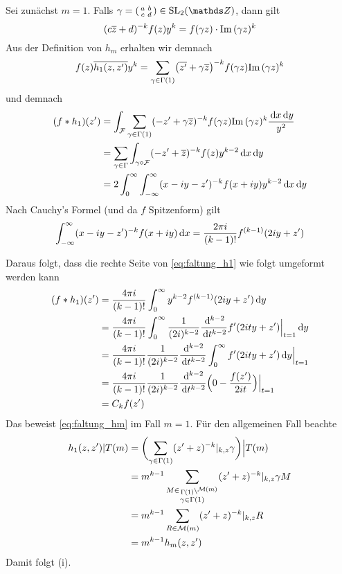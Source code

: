 \begin{bewe}
	Sei zunächst $m=1$.
	Falls $\gamma = \abcd \in \SL_2(\ZZ)$, dann gilt
	\[
	(c\overline{z} + d)^{-k} f(z) y^k = f(\gamma z) \cdot \mathrm{Im}\, (\gamma z)^k
	\]
	Aus der Definition von $h_m$ erhalten wir demnach
	\[
	f(z)\overline{h_1(z, z')} y^k
	= \sum_{\gamma \in \Gamma(1)} \bigl(\overline{z'} + \gamma \overline{z}\bigr)^{-k} f(\gamma z) \mathrm{Im}\,(\gamma z)^k
	\]
	und demnach
	\begin{equation}\label{eq:faltung_h1}%
	\begin{split}
	(f * h_1)(z') &= \int_\F \sum_{\gamma \in \Gamma(1)} (-z' + \gamma \conj z)^{-k} f(\gamma z) \Im(\gamma z)^k \frac{\opd x \opd y}{y^2} \\
	&= \sum_{\gamma \in \Gamma} \int_{\gamma \circ \F} (-z' + \conj z)^{-k} f(z) y^{k-2} \opd x \opd y \\
	&= 2 \int_0^\infty \int_{-\infty}^\infty (x-iy - z')^{-k} f(x+iy) y^{k-2} \opd x \opd y
	\end{split}
	\end{equation}
	Nach Cauchy's Formel (und da $f$ Spitzenform) gilt
	\[
	\int_{-\infty}^\infty (x-iy - z')^{-k} f(x+iy) \,\mathrm{d} x
	= \frac{2\pi i}{(k-1)!} f^{(k-1)} (2iy + z')
	\]
	
	Daraus folgt, dass die rechte Seite von \eqref{eq:faltung_h1} wie folgt umgeformt werden kann
	\begin{equation*}
	\begin{split}
	(f * h_1)(z') &= \frac{4\pi i}{(k-1)!} \int_0^\infty y^{k-2} f^{(k-1)} (2iy + z') \,\mathrm{d} y \\
	&= \frac{4\pi i}{(k-1)!} \int_0^\infty \frac{1}{(2i)^{k-2}} \frac{\,\mathrm{d}^{k-2}}{\,\mathrm{d} t^{k-2}} f'(2ity + z') \Big|_{t=1} \,\mathrm{d} y \\
	&= \frac{4\pi i}{(k-1)!} \frac{1}{(2i)^{k-2}} \frac{\,\mathrm{d}^{k-2}}{\,\mathrm{d} t^{k-2}} \int_0^\infty f'(2i ty + z') \,\mathrm{d} y \Big|_{t=1} \\
	&= \frac{4\pi i}{(k-1)!} \frac{1}{(2i)^{k-2}} \frac{\,\mathrm{d}^{k-2}}{\,\mathrm{d} t^{k-2}} \Bigl( 0 - \frac{f(z')}{2it}\Bigr) \Big|_{t=1} \\
	&= C_k f(z')
	\end{split}
	\end{equation*}
	Das beweist \eqref{eq:faltung_hm} im Fall $m=1$.
	Für den allgemeinen Fall beachte
	\[
	\begin{split}
	h_1(z,z')|T(m)
	&= \biggl(\sum_{\gamma\in\Gamma(1)} (z'+z)^{-k} |_{k,z} \gamma\biggr)\Big|T(m) \\
	&= m^{k-1} \sum_{\substack{M \in \linksmodulo{\Gamma(1)}{\M(m)}\\ \gamma \in \Gamma(1)}} (z'+z)^{-k} |_{k,z} \gamma M \\
	&= m^{k-1} \sum_{R \in \M(m)} (z'+z)^{-k}|_{k,z} R \\
	&= m^{k-1} h_m(z,z')
	\end{split}
	\]
	Damit folgt (i).
	

\end{bewe}
